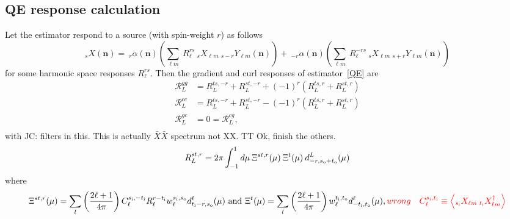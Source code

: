\documentclass{article}
\newcommand{\si}[0]{{s_{\rm i}}}
\newcommand{\ti}[0]{{t_{\rm i}}}
\newcommand{\so}[0]{{s_{\rm o}}}
\renewcommand{\to}[0]{{t_{\rm o}}}
\newcommand{\Ylm}[1]{\:_{#1}Y_{\ell m}}
\newcommand{\av}[1]{\left\langle #1 \right\rangle}
\newcommand{\resp}{ {\mathcal R} }
\newcommand{\red}[1]{\color{red}#1 \color{black} }
\newcommand{\JC}[1]{\color{red}JC: #1\color{black}}
\newcommand{\hn}[0]{\boldsymbol{n}}
\begin{document}
\subsection{QE response calculation}
Let the estimator respond to a source (with spin-weight $r$) as follows
\begin{equation}
	_{s}X(\hn) = \:_{r}\alpha(\hn) \left( \sum_{\ell m}\: R_\ell^{r s} \:_sX_{\ell m} \Ylm {s- r}(\hn)\right) + \:_{-r}\alpha(\hn) \left( \sum_{\ell m}\: R_\ell^{-r s} \:_sX_{\ell m} \Ylm {s + r}(\hn) \right)
\end{equation}
for some harmonic space responses $R_\ell^{rs}$. Then the gradient and curl responses of estimator~\eqref{QE} are
\begin{equation}\boxed{
	\begin{split}
		\resp^{gg}_L &= R_L^{ts, -r} + R_L^{st, -r} + (-1)^r \left(  R_L^{ts, r} + R_L^{st, r}\right) \\
		\resp^{cc}_L &= R_L^{ts, -r} + R_L^{st, -r} - (-1)^r \left(  R_L^{ts, r} + R_L^{st, r}\right) \\
		\resp^{gc}_L &= 0 = \resp^{cg}_L, \\
	\end{split}}
\end{equation}
with \JC{ filters  in this. This is actually $\bar X \bar X$ spectrum not XX. TT Ok, finish the others.}
\begin{equation}
R_L^{st, r} = 2\pi \int_{-1}^1d\mu\:\Xi^{st, r}(\mu)\:\Xi^{t}(\mu) \:d^L_{-r, \so + \to}(\mu)
\end{equation}
where
\begin{equation}
	\Xi^{st, r}(\mu) = \sum_{l}\left(\frac{2\ell + 1}{4\pi}\right) C_\ell^{\si,-\ti} R^{r - \ti}_\ell w^{\si,\so}_\ell d^\ell_{\ti - r, \so}(\mu) \textrm{  and   } \Xi^{t}(\mu) = \sum_{l}\left(\frac{2\ell + 1}{4\pi}\right) w^{\ti,\to}_\ell d^\ell_{-\ti, \to}(\mu), \red{wrong \quad C_\ell^{\si, \ti} \equiv  \av{_{\si}X_{\ell m}\: _{\ti}X^\dagger_{\ell m}} }
\end{equation}
\clearpage
\newpage
\end{document}
